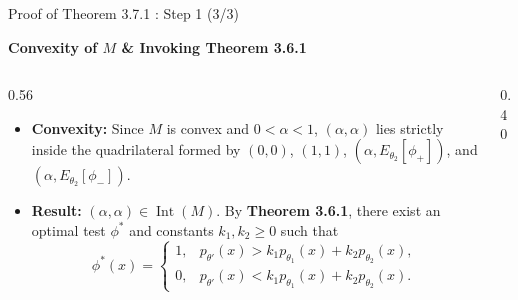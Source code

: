 \documentclass[10pt, aspectratio=169, xcolor=dvipsnames]{beamer}
\newcommand{\lead}[1]{{\color{UniBlue}\bfseries #1}}
\begin{document}
\begin{frame}{Proof of Theorem 3.7.1 : Step 1 (3/3)}
    
    \lead{Convexity of $M$ \& Invoking Theorem 3.6.1}\\
    \vspace{0.2cm}
    
    \begin{columns}[T, onlytextwidth]
        \begin{column}{0.56\textwidth}
            \color{Slate}
            \begin{itemize}
                \setlength\itemsep{8pt}
                \item[\textcolor{Teal}{\textbullet}] \textbf{Convexity:} Since $M$ is convex and $0 < \alpha < 1$, $(\alpha, \alpha)$ lies strictly inside the quadrilateral formed by $(0,0)$, $(1,1)$, $(\alpha, E_{\theta_2}[\phi_+])$, and $(\alpha, E_{\theta_2}[\phi_-])$.
                
                \item[\textcolor{Teal}{\textbullet}] \textbf{Result:} $(\alpha, \alpha) \in \operatorname{Int}(M)$. By \textbf{Theorem 3.6.1}, there exist an optimal test $\phi^*$ and constants $k_1, k_2 \ge 0$ such that
                \[
                    \phi^*(x) = \begin{cases}
                        1, & p_{\theta'}(x) > k_1 p_{\theta_1}(x) + k_2 p_{\theta_2}(x), \\
                        0, & p_{\theta'}(x) < k_1 p_{\theta_1}(x) + k_2 p_{\theta_2}(x).
                    \end{cases}
                \]
            \end{itemize}
        \end{column}
        
        \begin{column}{0.40\textwidth}
            \centering
            \vspace{0.2cm}
\end{column}
\end{columns}
\end{frame}
\end{document}
